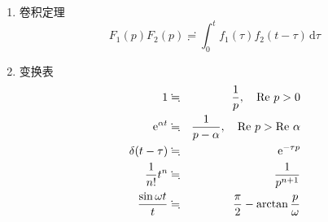 \documentclass[12pt,a4paper]{article}
\newcommand\diff{\,\mathrm{d}}
\renewcommand{\[}{\ $\displaystyle}
\renewcommand{\]}{$\ }%
\newcommand\mi{\mathrm{i}}
\newcommand\e{\mathrm{e}}
\begin{document}
\begin{enumerate}
	   \item 卷积定理
	   	$$
	   	  F_1(p)F_2(p) \risingdotseq \int_0^t f_1(\tau)f_2(t-\tau)\diff\tau
	   	$$
	   \item 变换表
	   	\begin{eqnarray*}
	   	  1 &\fallingdotseq & \frac 1p ,\quad \re p>0 \\
	   	  \e^{\alpha t} &\fallingdotseq & \frac{1}{p-\alpha} , \quad \re p>\re \alpha \\
	   	  \delta(t-\tau) &\fallingdotseq & \e^{-\tau p} \\
	   	  \frac 1{n!} t^n &\fallingdotseq & \frac 1{p^{n+1}}\\
	   	  \frac{\sin\omega t}{t} &\fallingdotseq & \frac \pi 2 - \arctan \frac p\omega \\
	   	\end{eqnarray*}
	 \end{enumerate}
	 
\end{document}
